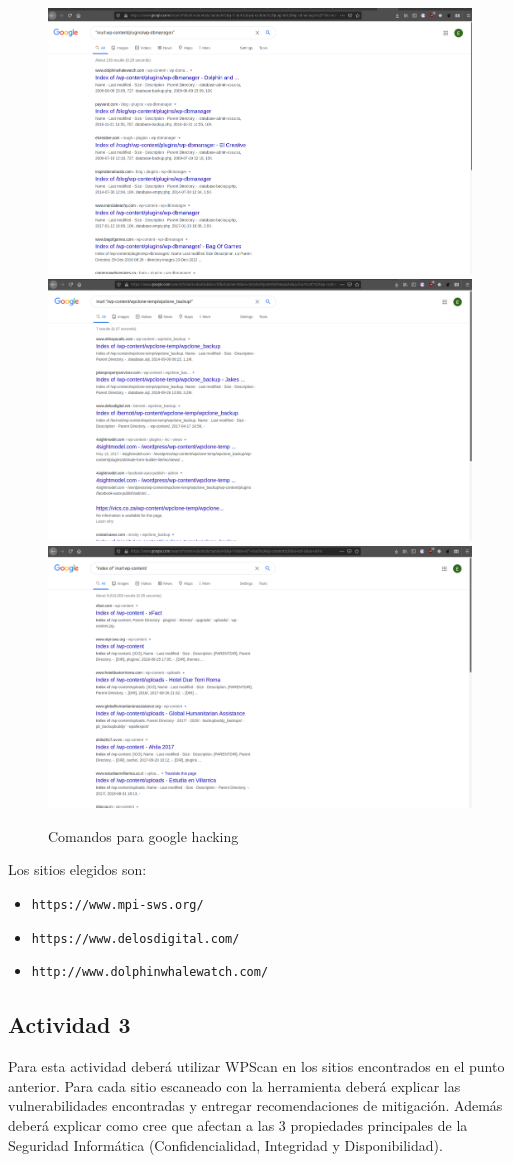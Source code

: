 \documentclass[11pt]{utalcaDoc}
\begin{document}
\begin{figure}[H]
	\centering
\begin{multicols}{3}
	\includegraphics[width=.30\textwidth]{images/google1.png}\\
	\includegraphics[width=.30\textwidth]{images/google2.png}\\
	\includegraphics[width=.30\textwidth]{images/google3.png}\\
\end{multicols}
\caption{Comandos para google hacking}
\label{FIG:google}
\end{figure}

Los sitios elegidos son:
\begin{itemize}
	\item \texttt{https://www.mpi-sws.org/}
	\item \texttt{https://www.delosdigital.com/}
	\item \texttt{http://www.dolphinwhalewatch.com/}
\end{itemize}



\subsection{Actividad 3}{Para esta actividad deberá utilizar WPScan en los sitios encontrados en el punto anterior.
Para cada sitio escaneado con la herramienta deberá explicar las vulnerabilidades encontradas y
entregar recomendaciones de mitigación. Además deberá explicar como cree que afectan a las 3
propiedades principales de la Seguridad Informática (Confidencialidad, Integridad y Disponibilidad).}
\end{document}
